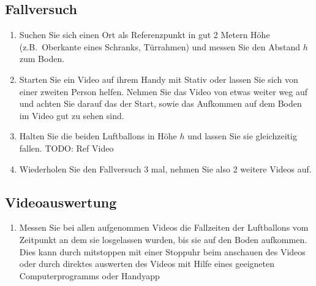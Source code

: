 \documentclass{article}
\begin{document}
        \subsection{Fallversuch}
            \begin{enumerate}[resume]
                \item Suchen Sie sich einen Ort als Referenzpunkt in gut 2 Metern Höhe (z.B.\ Oberkante eines Schranks, Türrahmen) und messen Sie
                den Abstand \(h\) zum Boden.
                \item Starten Sie ein Video auf ihrem Handy mit Stativ oder lassen Sie sich von einer zweiten Person helfen.
                Nehmen Sie das Video von etwas weiter weg auf und achten Sie darauf das der Start, sowie das Aufkommen auf dem Boden im Video gut zu sehen sind.
                \item Halten Sie die beiden Luftballons in Höhe \(h\) und lassen Sie sie gleichzeitig fallen. TODO: Ref Video
                \item Wiederholen Sie den Fallversuch 3 mal, nehmen Sie also 2 weitere Videos auf.
            \end{enumerate}
            
        \subsection{Videoauswertung}
            \begin{enumerate}
                \item Messen Sie bei allen aufgenommen Videos die Fallzeiten der Luftballons vom Zeitpunkt an dem sie losgelassen wurden, bis sie auf den Boden aufkommen.
                Dies kann durch mitstoppen mit einer Stoppuhr beim anschauen des Videos oder durch direktes auswerten des Videos mit Hilfe eines geeigneten Computerprogramms oder Handyapp
            \end{enumerate}
    
\end{document}
